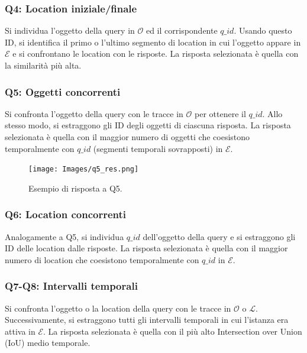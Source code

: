 \subsubsection*{Q4: Location iniziale/finale}
Si individua l'oggetto della query in $\mathcal{O}$ ed il corrispondente $q\_id$. Usando questo ID, si identifica il primo o l'ultimo segmento di location in cui l'oggetto appare in $\mathcal{E}$ e si confrontano le location con le risposte. La risposta selezionata è quella con la similarità più alta.

\subsubsection*{Q5: Oggetti concorrenti}
Si confronta l'oggetto della query con le tracce in $\mathcal{O}$ per ottenere il $q\_id$. Allo stesso modo, si estraggono gli ID degli oggetti di ciascuna risposta. La risposta selezionata è quella con il maggior numero di oggetti che coesistono temporalmente con $q\_id$ (segmenti temporali sovrapposti) in $\mathcal{E}$.

\begin{figure}[H]
    \centering
    \texttt{[image: Images/q5\_res.png]}
    \caption{Esempio di risposta a Q5.}
    \label{fig:q5_example}
\end{figure}

\subsubsection*{Q6: Location concorrenti}
Analogamente a Q5, si individua $q\_id$ dell'oggetto della query e si estraggono gli ID delle location dalle risposte. La risposta selezionata è quella con il maggior numero di location che coesistono temporalmente con $q\_id$ in $\mathcal{E}$.

\subsubsection*{Q7-Q8: Intervalli temporali}
Si confronta l'oggetto o la location della query con le tracce in $\mathcal{O}$ o $\mathcal{L}$. Successivamente, si estraggono tutti gli intervalli temporali in cui l'istanza era attiva in $\mathcal{E}$. La risposta selezionata è quella con il più alto Intersection over Union (IoU) medio temporale.